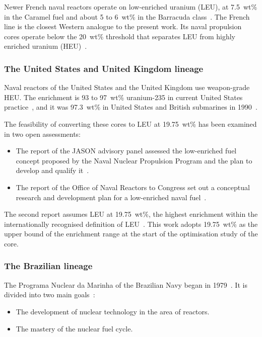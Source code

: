 Newer French naval reactors operate
on low-enriched uranium (LEU), at 7.5~wt\% in the Caramel fuel and about
5 to 6~wt\% in the Barracuda class~\cite{wna_ships}. The French line is the closest Western analogue to the present work.
Its naval propulsion cores operate below the 20~wt\% threshold that
separates LEU from highly enriched uranium (HEU)~\cite{nrc_10cfr110_2}.

\subsubsection{The United States and United Kingdom lineage}
\label{subsec:lineage-us-uk}
Naval reactors of the United States and the United Kingdom use
weapon-grade HEU. The enrichment is 93 to 97~wt\% uranium-235 in current
United States practice~\cite{jason_2016}, and it was 97.3~wt\% in United
States and British submarines in 1990~\cite{ippolito_1990}.

The feasibility of converting these cores to LEU at 19.75~wt\% has been
examined in two open assessments:

\begin{itemize}
  \item The report of the JASON advisory panel assessed the low-enriched
        fuel concept proposed by the Naval Nuclear Propulsion Program and
        the plan to develop and qualify it~\cite{jason_2016}.

  \item The report of the Office of Naval Reactors to Congress set out a
        conceptual research and development plan for a low-enriched naval
        fuel~\cite{onr_leu_2016}.
\end{itemize}

The second report assumes LEU at 19.75~wt\%, the highest enrichment
within the internationally recognised definition of
LEU~\cite{onr_leu_2016}. This work adopts 19.75~wt\% as the upper bound
of the enrichment range at the start of the optimisation study of the
core.

\subsubsection{The Brazilian lineage}
\label{subsec:lineage-brazil}
The Programa Nuclear da Marinha of the Brazilian Navy began in
1979~\cite{vasconcelos_fapesp_2025}. It is divided into two main
goals~\cite{marinha_relatorio_gestao_2025}:

\begin{itemize}
  \item The development of nuclear technology in the area of reactors.

  \item The mastery of the nuclear fuel cycle.
\end{itemize}

